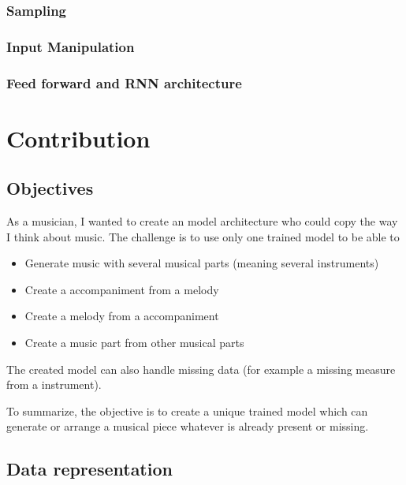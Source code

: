 \documentclass[12pt]{report}
\begin{document}
\subsection{Sampling}

\subsection{Input Manipulation}

\subsection{Feed forward and RNN architecture}

\newpage
\chapter{Contribution}
\label{chap:contribution}


\section{Objectives}
\label{seq:objectives}

As a musician, I wanted to create an model architecture who could copy the way I think about music.
The challenge is to use only one trained model to be able to 
\begin{itemize}
    \item Generate music with several musical parts (meaning several instruments)
    \item Create a accompaniment from a melody
    \item Create a melody from a accompaniment
    \item Create a music part from other musical parts
\end{itemize}
The created model can also handle missing data (for example a missing measure from a instrument).

To summarize, the objective is to create a unique trained model which can generate or arrange a musical piece whatever is already present or missing.

\section{Data representation}
\end{document}
